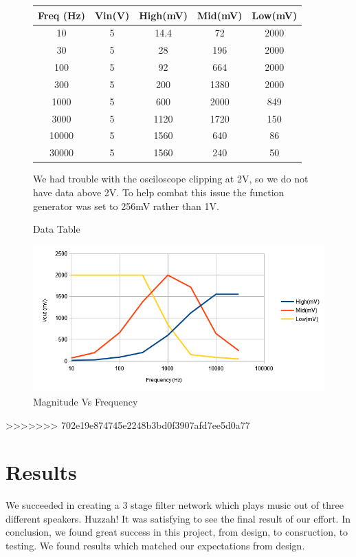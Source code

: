 \documentclass{article}
\begin{document}
\begin{figure}[!ht]
\caption{Data Table}
\begin{center}
\begin{tabular}{|c|c|c|c|c|}
\hline
Freq (Hz)&Vin(V)&High(mV)&Mid(mV)&Low(mV)\\
\hline
10&5&14.4&72&2000\\
\hline
30&5&28&196&2000\\
\hline
100&5&92&664&2000\\
\hline
300&5&200&1380&2000\\
\hline
1000&5&600&2000&849\\
\hline
3000&5&1120&1720&150\\
\hline
10000&5&1560&640&86\\
\hline
30000&5&1560&240&50\\
\hline
\end{tabular}
\begin{flushleft}
We had trouble with the osciloscope clipping at 2V, so we do not have data above 2V. To help combat this issue the function generator was set to 256mV rather than 1V.
\end{flushleft}
\end{center}
\end{figure}
\begin{figure}[!h]
\centering
\caption{Magnitude Vs Frequency}
\includegraphics[width=\linewidth]{magnitudevsfrequency}
\end{figure}
>>>>>>> 702e19e874745e2248b3bd0f3907afd7ee5d0a77
\section*{Results}
We succeeded in creating a 3 stage filter network which plays music out of 
three different speakers. Huzzah! It was satisfying to see the final result
of our effort. In conclusion, we found great success in this project, from design, 
to consruction, to testing. We found results which matched our expectations 
from design. 
\end{document}
